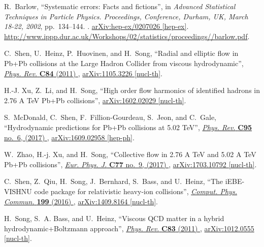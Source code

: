 \documentclass[ALICE,manyauthors]{cernphprep}
\begin{document}
\begin{thebibliography}{10}
R.~Barlow, ``{Systematic errors: Facts and fictions}'', in {\em {Advanced
  Statistical Techniques in Particle Physics. Proceedings, Conference, Durham,
  UK, March 18-22, 2002}}, pp.~134--144.
.
\newblock \href{http://arxiv.org/abs/hep-ex/0207026}{{\ttfamily
  arXiv:hep-ex/0207026 [hep-ex]}}.
\newblock
\url{http://www.ippp.dur.ac.uk/Workshops/02/statistics/proceedings//barlow.pdf}.
\newblock

C.~Shen, U.~Heinz, P.~Huovinen, and H.~Song, ``{Radial and elliptic flow in
  Pb+Pb collisions at the Large Hadron Collider from viscous hydrodynamic}'',
  \href{http://dx.doi.org/10.1103/PhysRevC.84.044903}{{\em Phys. Rev.}
  {\bfseries C84} (2011) },
\href{http://arxiv.org/abs/1105.3226}{{\ttfamily arXiv:1105.3226 [nucl-th]}}.

H.-J. Xu, Z.~Li, and H.~Song, ``{High order flow harmonics of identified
  hadrons in 2.76 A TeV Pb+Pb collisions}'',
\href{http://arxiv.org/abs/1602.02029}{{\ttfamily arXiv:1602.02029 [nucl-th]}}.

S.~McDonald, C.~Shen, F.~Fillion-Gourdeau, S.~Jeon, and C.~Gale,
  ``{Hydrodynamic predictions for Pb+Pb collisions at 5.02 TeV}'',
  \href{http://dx.doi.org/10.1103/PhysRevC.95.064913}{{\em Phys. Rev.}
  {\bfseries C95} no.~6, (2017) },
\href{http://arxiv.org/abs/1609.02958}{{\ttfamily arXiv:1609.02958 [hep-ph]}}.

W.~Zhao, H.-j. Xu, and H.~Song, ``{Collective flow in 2.76 A TeV and 5.02 A TeV
  Pb+Pb collisions}'',
  \href{http://dx.doi.org/10.1140/epjc/s10052-017-5186-x}{{\em Eur. Phys. J.}
  {\bfseries C77} no.~9, (2017) },
\href{http://arxiv.org/abs/1703.10792}{{\ttfamily arXiv:1703.10792 [nucl-th]}}.

C.~Shen, Z.~Qiu, H.~Song, J.~Bernhard, S.~Bass, and U.~Heinz, ``{The
  iEBE-VISHNU code package for relativistic heavy-ion collisions}'',
  \href{http://dx.doi.org/10.1016/j.cpc.2015.08.039}{{\em Comput. Phys.
  Commun.} {\bfseries 199} (2016) },
\href{http://arxiv.org/abs/1409.8164}{{\ttfamily arXiv:1409.8164 [nucl-th]}}.

H.~Song, S.~A. Bass, and U.~Heinz, ``{Viscous QCD matter in a hybrid
  hydrodynamic+Boltzmann approach}'',
  \href{http://dx.doi.org/10.1103/PhysRevC.83.024912}{{\em Phys. Rev.}
  {\bfseries C83} (2011) },
\href{http://arxiv.org/abs/1012.0555}{{\ttfamily arXiv:1012.0555 [nucl-th]}}.


\end{thebibliography}
\end{document}
